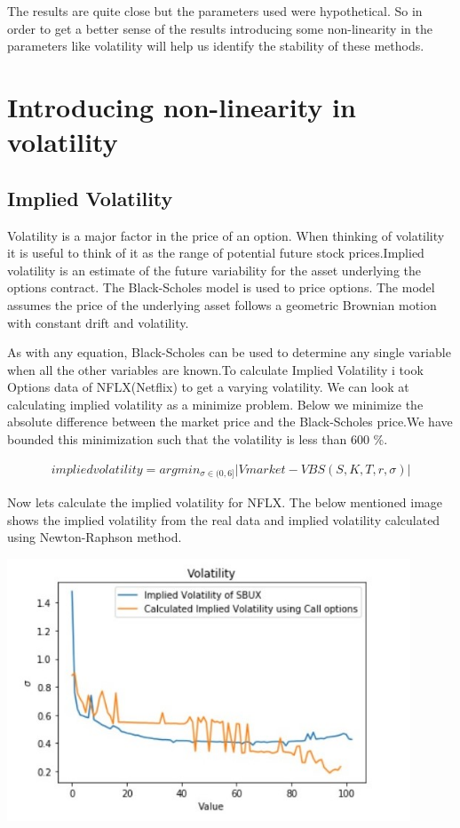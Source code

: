 \documentclass[12pt]{article}
\begin{document}
 The results are quite close but the parameters used were hypothetical. So in order to get a better sense of the results introducing some non-linearity in the parameters like volatility will help us identify the stability of these methods.
 
  
\section{Introducing non-linearity in volatility}

 \subsection{Implied Volatility}
 Volatility is a major factor in the price of an option. When thinking of volatility it is useful to think of it as the range of potential future stock prices.Implied volatility is an estimate of the future variability for the asset underlying the options contract. The Black-Scholes model is used to price options. The model assumes the price of the underlying asset follows a geometric Brownian motion with constant drift and volatility.
 
 As with any equation, Black-Scholes can be used to determine any single variable when all the other variables are known.To calculate Implied Volatility i took Options data of NFLX(Netflix) to get a varying volatility. We can look at calculating implied volatility as a minimize problem. Below we minimize the absolute difference between the market price and the Black-Scholes price.We have bounded this minimization such that the volatility is less than 600 \%.
 
 
\begin{align}
	implied volatility=argmin_{\sigma \in(0,6]} |Vmarket  - VBS(S,K,T,r,\sigma)|
\end{align}

Now lets calculate the implied volatility for NFLX. The below mentioned image shows the implied volatility from the real data and implied volatility calculated using Newton-Raphson method.

\includegraphics[width=12cm]{p6}
\end{document}
